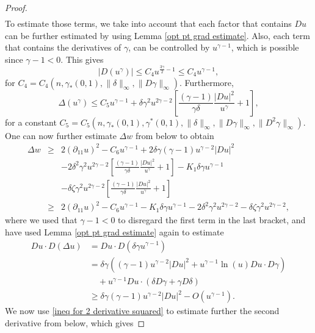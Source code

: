 \documentclass[reqno,11pt]{amsart}
\newcommand{\1}{\mathds{1}}
\numberwithin{equation}{section}
\begin{document}
\begin{proof}
\begin{eqnarray*}
\end{eqnarray*}
To estimate those terms, we take into account that each factor that contains $Du$ can be further estimated by using Lemma \ref{opt pt grad estimate}. Also, each term that contains the derivatives of $\gamma$, can be controlled by $u^{\gamma-1}$, which is possible since $\gamma - 1 < 0$. This gives
$$
    |D(u^\gamma)| \leq C_4 u^{\frac{3\gamma}{2}-1} \leq C_4u^{\gamma - 1},
$$
for $C_4 = C_4(n, \gamma_\ast(0,1), \|\delta\|_\infty, \|D\gamma\|_\infty)$. Furthermore,
$$
    \Delta (u^\gamma) \leq C_5 u^{\gamma-1} + \delta \gamma^2 u^{2\gamma-2}\left[ \frac{(\gamma-1)}{\gamma \delta} \frac{|Du|^2}{u^\gamma} +1 \right],
$$
for a constant $C_5 = C_5(n, \gamma_\ast (0,1), \gamma^\ast(0,1), \|\delta\|_\infty,\|D\gamma\|_\infty, \|D^2 \gamma\|_\infty)$. One can now further estimate $\Delta w$ from below to obtain
\begin{eqnarray*}
     \Delta w & \geq & \displaystyle 2  (\partial_{11} u)^2 - C_6u^{\gamma-1} + 2\delta \gamma (\gamma-1)u^{\gamma-2}|Du|^2\\
            & &\displaystyle  - 2\delta^2 \gamma^2 u^{2\gamma-2} \left[ \frac{(\gamma-1)}{\gamma \delta} \frac{|Du|^2}{u^\gamma} +1 \right] -K_1 \delta \gamma u^{\gamma-1}\\
            & & \displaystyle -\delta \zeta \gamma^2 u^{2\gamma-2} \left[ \frac{(\gamma-1)}{\gamma \delta} \frac{|Du|^2}{u^\gamma} +1 \right]\\[0.4cm]
            & \geq & \displaystyle 2  (\partial_{11} u)^2 - C_6u^{\gamma-1} - K_1 \delta \gamma u^{\gamma-1}- 2\delta^2 \gamma^2 u^{2\gamma-2}  -\delta \zeta \gamma^2 u^{2\gamma-2}, 
\end{eqnarray*}
where we used that $\gamma - 1 < 0$ to disregard the first term in the last bracket, and have used Lemma \ref{opt pt grad estimate} again to estimate
\begin{align*}
    Du \cdot D(\Delta u) & = Du \cdot D(\delta \gamma u^{\gamma-1})\\
                         & =  \delta \gamma ((\gamma-1)u^{\gamma-2}|Du|^2 + u^{\gamma-1}\ln(u)Du \cdot D\gamma)\\
                         & \quad + u^{\gamma-1} Du \cdot (\delta D\gamma + \gamma D\delta)\\
                         & \geq \delta \gamma (\gamma-1)u^{\gamma-2}|Du|^2 - O\left(u^{\gamma-1}\right).
\end{align*}       
We now use \eqref{ineq for 2 derivative squared} to estimate further the second derivative from below, which gives

\end{proof}
\end{document}
